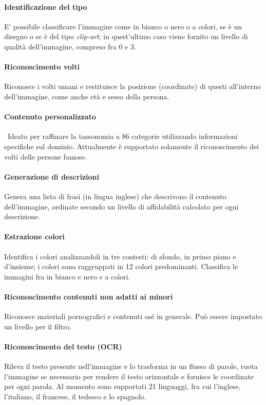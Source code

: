\paragraph{Identificazione del tipo} E' possibile classificare l'immagine come in bianco o nero o a colori, se è un disegno o se è del tipo \textit{clip-art}; in quest'ultimo caso viene fornito un livello di qualità dell'immagine, compreso fra 0 e 3.

\paragraph{Riconoscimento volti} Riconosce i volti umani e restituisce la posizione (coordinate) di questi all'interno dell'immagine, come anche età e sesso della persona.

\paragraph{Contenuto personalizzato} Ideato per raffinare la tassonomia a 86 categorie utilizzando informazioni specifiche sul dominio. Attualmente è supportato solamente il riconoscimento dei volti delle persone famose.

\paragraph{Generazione di descrizioni} Genera una lista di frasi (in lingua inglese) che descrivono il contenuto dell'immagine, ordinate secondo un livello di affidabilità calcolato per ogni descrizione.

\paragraph{Estrazione colori} Identifica i colori analizzandoli in tre contesti: di sfondo, in primo piano e d'insieme; i colori sono raggruppati in 12 colori predominanti. Classifica le immagini fra in bianco e nero e a colori.

\paragraph{Riconoscimento contenuti non adatti ai minori} Riconosce materiali pornografici e contenuti osé in generale. Può essere impostato un livello per il filtro.

\paragraph{Riconoscimento del testo (OCR)} Rileva il testo presente nell'immagine e lo trasforma in un flusso di parole, ruota l'immagine se necessario per rendere il testo orizzontale e fornisce le coordinate per ogni parola. Al momento sono supportati 21 linguaggi, fra cui l'inglese, l'italiano, il francese, il tedesco e lo spagnolo.

